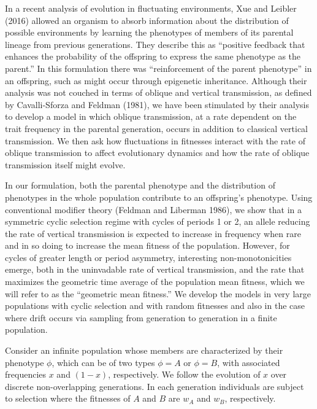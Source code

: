 In a recent analysis of evolution in fluctuating environments, Xue and Leibler (2016) allowed an organism to absorb information about the distribution of possible environments by learning the phenotypes of members of its parental lineage from previous generations. They describe this as ``positive feedback that enhances the probability of the offspring to express the same phenotype as the parent.'' In this formulation there was ``reinforcement of the parent phenotype'' in an offspring, such as might occur through epigenetic inheritance. Although their analysis was not couched in terms of oblique and vertical transmission, as defined by Cavalli-Sforza and Feldman (1981), we have been stimulated by their analysis to develop a model in which oblique transmission, at a rate dependent on the trait frequency in the parental generation, occurs in addition to classical vertical transmission. We then ask how fluctuations in fitnesses interact with the rate of oblique transmission to affect evolutionary dynamics and how the rate of oblique transmission itself might evolve. 

In our formulation, both the parental phenotype and the distribution of phenotypes in the whole population contribute to an offspring's phenotype. Using conventional modifier theory (Feldman and Liberman 1986), we show that in a symmetric cyclic selection regime with cycles of periods 1 or 2, an allele reducing the rate of vertical transmission is expected to increase in frequency when rare and in so doing to increase the mean fitness of the population. However, for cycles of greater length or period asymmetry, interesting non-monotonicities emerge, both in the uninvadable rate of vertical transmission, and the rate that maximizes the geometric time average of the population mean fitness, which we will refer to as the ``geometric mean fitness.'' We develop the models in very large populations with cyclic selection and with random fitnesses and also in the case where drift occurs via sampling from generation to generation in a finite population.

\bigskip\bigskip


\smallskip

Consider an infinite population whose members are characterized by their phenotype $\phi$, which can be of two types $\phi=A$ or $\phi=B$, with associated frequencies $x$ and $(1-x)$, respectively. We follow the evolution of $x$ over discrete non-overlapping generations. In each generation individuals are subject to  selection where the fitnesses of $A$ and $B$ are $w_A$ and $w_B$, respectively.

